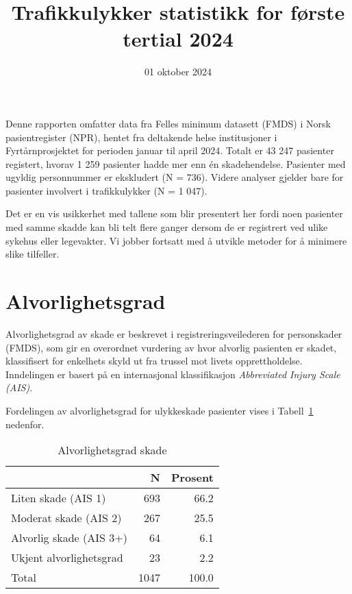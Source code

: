 \documentclass[
  letterpaper,
  DIV=11,
  numbers=noendperiod]{scrartcl}
\title{Trafikkulykker statistikk for første tertial 2024}
\subtitle{01 oktober 2024}
\author{}
\date{}
\begin{document}
\maketitle


Denne rapporten omfatter data fra Felles minimum datasett (FMDS) i Norsk
pasientregister (NPR), hentet fra deltakende helse institusjoner i
Fyrtårnprosjektet for perioden januar til april 2024. Totalt er 43 247
pasienter registert, hvorav 1 259 pasienter hadde mer enn én
skadehendelse. Pasienter med ugyldig personnummer er ekskludert (N =
736). Videre analyser gjelder bare for pasienter involvert i
trafikkulykker (N = 1 047).

Det er en vis usikkerhet med tallene som blir presentert her fordi noen
pasienter med samme skadde kan bli telt flere ganger dersom de er
registrert ved ulike sykehus eller legevakter. Vi jobber fortsatt med å
utvikle metoder for å minimere slike tilfeller.

\section{Alvorlighetsgrad}\label{alvorlighetsgrad}

Alvorlighetsgrad av skade er beskrevet i registreringsveilederen for
personskader (FMDS), som gir en overordnet vurdering av hvor alvorlig
pasienten er skadet, klassifisert for enkelhets skyld ut fra trussel mot
livets opprettholdelse. Inndelingen er basert på en internasjonal
klassifikasjon \emph{Abbreviated Injury Scale (AIS)}.

Fordelingen av alvorlighetsgrad for ulykkeskade pasienter vises i
Tabell~\ref{tbl-alvorlig} nedenfor.

\begingroup
\fontsize{12.0pt}{14.4pt}\selectfont

\begin{longtable}{lrr}

\caption{\label{tbl-alvorlig}Alvorlighetsgrad skade}

\tabularnewline

\toprule
  & N & Prosent \\ 
\midrule\addlinespace[2.5pt]
Liten skade (AIS 1) & 693 & 66.2 \\ 
Moderat skade (AIS 2) & 267 & 25.5 \\ 
Alvorlig skade (AIS 3+) & 64 & 6.1 \\ 
Ukjent alvorlighetsgrad & 23 & 2.2 \\ 
Total & 1047 & 100.0 \\ 
\bottomrule

\end{longtable}
\end{document}
